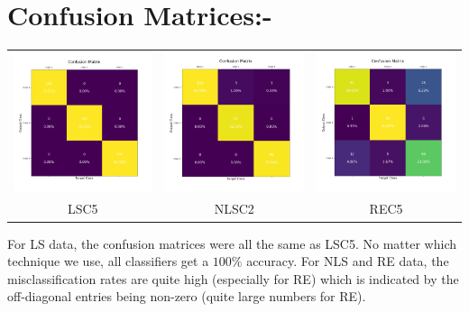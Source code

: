 \documentclass[11pt]{article}
\begin{document}
\section*{Confusion Matrices:-}
\begin{center}
  \setlength\tabcolsep{0pt}
  \begin{tabular}{ccc}
  \includegraphics[width=4.5cm]{classifier/LS_plots/ConfusionMatrix_Case5.png}
  & \includegraphics[width=4.5cm]{classifier/NLS_plots/ConfusionMatrix_Case2.png}
  & \includegraphics[width=4.5cm]{classifier/REAL_plots/ConfusionMatrix_Case5.png} \\
  LSC5 & NLSC2 & REC5 \\
  \end{tabular}
\end{center}
For LS data, the confusion matrices were all the same as LSC5. No matter which technique we use, all classifiers get a $100\%$ accuracy. For NLS and RE data, the misclassification rates are quite high (especially for RE) which is indicated by the off-diagonal entries being non-zero (quite large numbers for RE).
\end{document}
